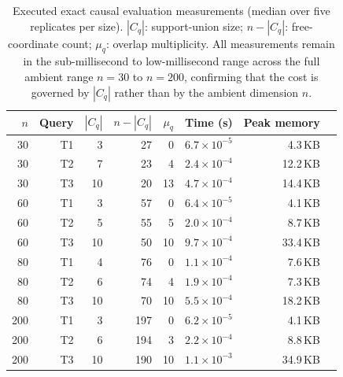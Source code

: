 \documentclass[11pt]{article}
\theoremstyle{definition}
\begin{document}
\begin{table}[h]
\centering
\small
\begin{tabular}{rrrrrrrl}
\toprule
\(n\) & Query & \(|C_q|\) & \(n-|C_q|\) & \(\mu_q\) & Time (s) & Peak memory \\
\midrule
 30 & T1 &  3 &  27 &  0 & \(6.7\times10^{-5}\) &  4.3\,KB \\
 30 & T2 &  7 &  23 &  4 & \(2.4\times10^{-4}\) & 12.2\,KB \\
 30 & T3 & 10 &  20 & 13 & \(4.7\times10^{-4}\) & 14.4\,KB \\
\midrule
 60 & T1 &  3 &  57 &  0 & \(6.4\times10^{-5}\) &  4.1\,KB \\
 60 & T2 &  5 &  55 &  5 & \(2.0\times10^{-4}\) &  8.7\,KB \\
 60 & T3 & 10 &  50 & 10 & \(9.7\times10^{-4}\) & 33.4\,KB \\
\midrule
 80 & T1 &  4 &  76 &  0 & \(1.1\times10^{-4}\) &  7.6\,KB \\
 80 & T2 &  6 &  74 &  4 & \(1.9\times10^{-4}\) &  7.3\,KB \\
 80 & T3 & 10 &  70 & 10 & \(5.5\times10^{-4}\) & 18.2\,KB \\
\midrule
200 & T1 &  3 & 197 &  0 & \(6.2\times10^{-5}\) &  4.1\,KB \\
200 & T2 &  6 & 194 &  3 & \(2.2\times10^{-4}\) &  8.8\,KB \\
200 & T3 & 10 & 190 & 10 & \(1.1\times10^{-3}\) & 34.9\,KB \\
\bottomrule
\end{tabular}
\caption{Executed exact causal evaluation measurements (median over five replicates per size).
\(|C_q|\): support-union size; \(n-|C_q|\): free-coordinate count;
\(\mu_q\): overlap multiplicity. All measurements remain in the sub-millisecond to
low-millisecond range across the full ambient range \(n=30\) to \(n=200\), confirming that
the cost is governed by \(|C_q|\) rather than by the ambient dimension \(n\).}
\label{tab:exact-method}
\end{table}
\end{document}
